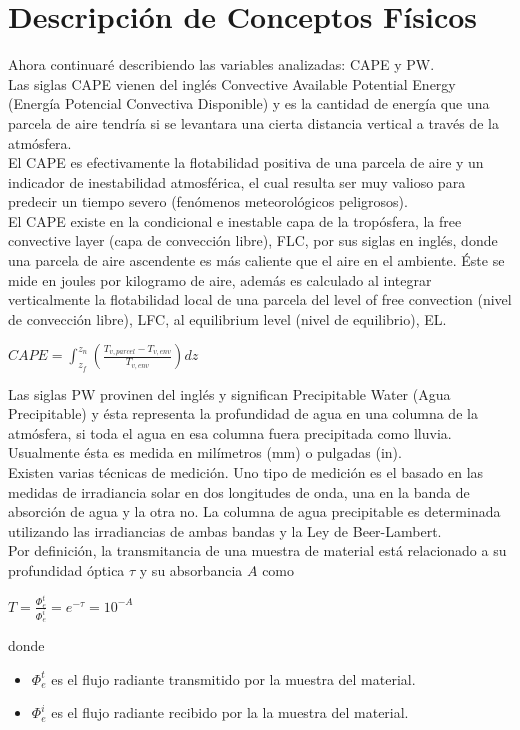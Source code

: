 \documentclass{article}
\begin{document}
\section{Descripción de Conceptos Físicos}
Ahora continuaré describiendo las variables analizadas: CAPE y PW.\\
Las siglas CAPE vienen del inglés Convective Available Potential Energy (Energía Potencial Convectiva Disponible) y es la cantidad de energía que una parcela de aire tendría si se levantara una cierta distancia vertical a través de la atmósfera.\\
El CAPE es efectivamente la flotabilidad positiva de una parcela de aire y un indicador de inestabilidad atmosférica, el cual resulta ser muy valioso para predecir un tiempo severo (fenómenos meteorológicos peligrosos).\\
El CAPE existe en la condicional e inestable capa de la tropósfera, la free convective layer (capa de convección libre), FLC, por sus siglas en inglés, donde una parcela de aire ascendente es más caliente que el aire en el ambiente. Éste se mide en joules por kilogramo de aire, además es calculado al integrar verticalmente la flotabilidad local de una parcela del level of free convection (nivel de convección libre), LFC, al equilibrium level (nivel de equilibrio), EL.\\
\begin{center}
$CAPE=\int_{z_{f}}^{z_{n}}(\frac{T_{v,parcel}-T_{v,env}}{T_{v,env}})dz$
\end{center}
Las siglas PW provinen del inglés y significan Precipitable Water (Agua Precipitable) y ésta representa la profundidad de agua en una columna de la atmósfera, si toda el agua en esa columna fuera precipitada como lluvia. Usualmente ésta es medida en milímetros (mm) o pulgadas (in).\\
Existen varias técnicas de medición. Uno tipo de medición es el basado en las medidas de irradiancia solar en dos longitudes de onda, una en la banda de absorción de agua y la otra no. La columna de agua precipitable es determinada utilizando las irradiancias de ambas bandas y la Ley de Beer-Lambert.\\
Por definición, la transmitancia de una muestra de material está relacionado a su profundidad óptica $\tau$ y su absorbancia $A$ como\\
\begin{center}
$T=\frac{\Phi_e^t}{\Phi_e^i}=e^{-\tau}=10^{-A}$
\end{center}
donde\\
\begin{itemize}
\item $\Phi_e^t$ es el flujo radiante transmitido por la muestra del material.
\item $\Phi_e^i$ es el flujo radiante recibido por la la muestra del material.\\
\end{itemize}
\end{document}
